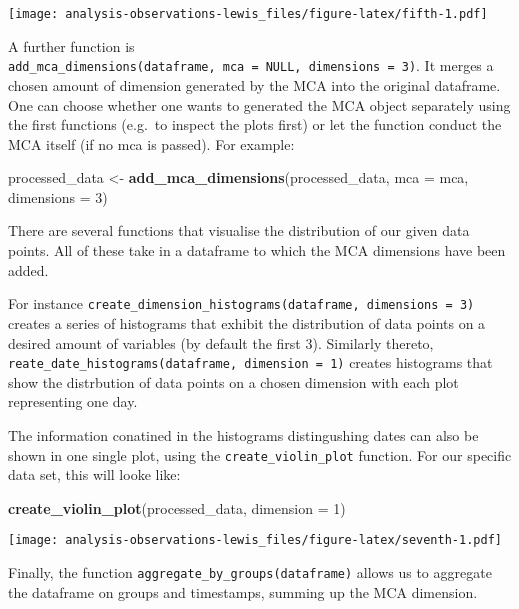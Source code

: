 \documentclass[]{article}
\newenvironment{Shaded}{\begin{snugshade}}{\end{snugshade}}
\newcommand{\KeywordTok}[1]{\textcolor[rgb]{0.13,0.29,0.53}{\textbf{{#1}}}}
\newcommand{\DataTypeTok}[1]{\textcolor[rgb]{0.13,0.29,0.53}{{#1}}}
\newcommand{\DecValTok}[1]{\textcolor[rgb]{0.00,0.00,0.81}{{#1}}}
\newcommand{\StringTok}[1]{\textcolor[rgb]{0.31,0.60,0.02}{{#1}}}
\newcommand{\NormalTok}[1]{{#1}}
\begin{document}
\texttt{[image: analysis-observations-lewis\_files/figure-latex/fifth-1.pdf]}

A further function is
\texttt{add\_mca\_dimensions(dataframe,\ mca\ =\ NULL,\ dimensions\ =\ 3)}.
It merges a chosen amount of dimension generated by the MCA into the
original dataframe. One can choose whether one wants to generated the
MCA object separately using the first functions (e.g.~to inspect the
plots first) or let the function conduct the MCA itself (if no mca is
passed). For example:

\begin{Shaded}
\begin{Highlighting}[]
  \NormalTok{processed_data <-}\StringTok{ }\KeywordTok{add_mca_dimensions}\NormalTok{(processed_data, }\DataTypeTok{mca =} \NormalTok{mca, }\DataTypeTok{dimensions =} \DecValTok{3}\NormalTok{)}
\end{Highlighting}
\end{Shaded}

There are several functions that visualise the distribution of our given
data points. All of these take in a dataframe to which the MCA
dimensions have been added.

For instance
\texttt{create\_dimension\_histograms(dataframe,\ dimensions\ =\ 3)}
creates a series of histograms that exhibit the distribution of data
points on a desired amount of variables (by default the first 3).
Similarly thereto,
\texttt{reate\_date\_histograms(dataframe,\ dimension\ =\ 1)} creates
histograms that show the distrbution of data points on a chosen
dimension with each plot representing one day.

The information conatined in the histograms distingushing dates can also
be shown in one single plot, using the \texttt{create\_violin\_plot}
function. For our specific data set, this will looke like:

\begin{Shaded}
\begin{Highlighting}[]
  \KeywordTok{create_violin_plot}\NormalTok{(processed_data, }\DataTypeTok{dimension =} \DecValTok{1}\NormalTok{)}
\end{Highlighting}
\end{Shaded}

\texttt{[image: analysis-observations-lewis\_files/figure-latex/seventh-1.pdf]}

Finally, the function \texttt{aggregate\_by\_groups(dataframe)} allows
us to aggregate the dataframe on groups and timestamps, summing up the
MCA dimension.
\end{document}
